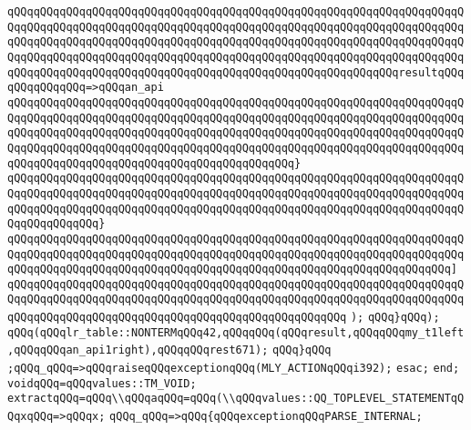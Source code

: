 \verb|qQQqqQQqqQQqqQQqqQQqqQQqqQQqqQQqqQQqqQQqqQQqqQQqqQQqqQQqqQQqqQQqqQQqqQQqqQQqqQQqqQQqqQQqqQQqqQQqqQQqqQQqqQQqqQQqqQQqqQQqqQQqqQQqqQQqqQQqqQQqqQQqqQQqqQQqqQQqqQQqqQQqqQQqqQQqqQQqqQQqqQQqqQQqqQQqqQQqqQQqqQQqqQQqqQQqqQQqqQQqqQQqqQQqqQQqqQQqqQQqqQQqqQQqqQQqqQQqqQQqqQQqqQQqqQQqqQQqqQQqqQQqqQQqqQQqqQQqqQQqqQQqqQQqqQQqqQQqqQQqqQQqqQQqqQQqqQQqqQQqresultqQQqqQQqqQQqqQQq=>qQQqan_api|\newline
\verb|qQQqqQQqqQQqqQQqqQQqqQQqqQQqqQQqqQQqqQQqqQQqqQQqqQQqqQQqqQQqqQQqqQQqqQQqqQQqqQQqqQQqqQQqqQQqqQQqqQQqqQQqqQQqqQQqqQQqqQQqqQQqqQQqqQQqqQQqqQQqqQQqqQQqqQQqqQQqqQQqqQQqqQQqqQQqqQQqqQQqqQQqqQQqqQQqqQQqqQQqqQQqqQQqqQQqqQQqqQQqqQQqqQQqqQQqqQQqqQQqqQQqqQQqqQQqqQQqqQQqqQQqqQQqqQQqqQQqqQQqqQQqqQQqqQQqqQQqqQQqqQQqqQQqqQQqqQQqqQQqqQQq}|\newline
\verb|qQQqqQQqqQQqqQQqqQQqqQQqqQQqqQQqqQQqqQQqqQQqqQQqqQQqqQQqqQQqqQQqqQQqqQQqqQQqqQQqqQQqqQQqqQQqqQQqqQQqqQQqqQQqqQQqqQQqqQQqqQQqqQQqqQQqqQQqqQQqqQQqqQQqqQQqqQQqqQQqqQQqqQQqqQQqqQQqqQQqqQQqqQQqqQQqqQQqqQQqqQQqqQQqqQQqqQQqqQQqqQQq}|\newline
\verb|qQQqqQQqqQQqqQQqqQQqqQQqqQQqqQQqqQQqqQQqqQQqqQQqqQQqqQQqqQQqqQQqqQQqqQQqqQQqqQQqqQQqqQQqqQQqqQQqqQQqqQQqqQQqqQQqqQQqqQQqqQQqqQQqqQQqqQQqqQQqqQQqqQQqqQQqqQQqqQQqqQQqqQQqqQQqqQQqqQQqqQQqqQQqqQQqqQQqqQQqqQQqqQQq]|\newline
\verb|qQQqqQQqqQQqqQQqqQQqqQQqqQQqqQQqqQQqqQQqqQQqqQQqqQQqqQQqqQQqqQQqqQQqqQQqqQQqqQQqqQQqqQQqqQQqqQQqqQQqqQQqqQQqqQQqqQQqqQQqqQQqqQQqqQQqqQQqqQQqqQQqqQQqqQQqqQQqqQQqqQQqqQQqqQQqqQQqqQQqqQQqqQQqqQQq|\newline
\verb|);|\newline
\verb|qQQq}qQQq);|\newline
\verb|qQQq(qQQqlr_table::NONTERMqQQq42,qQQqqQQq(qQQqresult,qQQqqQQqmy_t1left,qQQqqQQqan_api1right),qQQqqQQqrest671);|\newline
\verb|qQQq}qQQq|\newline
\verb|;qQQq_qQQq=>qQQqraiseqQQqexceptionqQQq(MLY_ACTIONqQQqi392);|\newline
\verb|esac;|\newline
\verb|end;|\newline
\verb|voidqQQq=qQQqvalues::TM_VOID;|\newline
\verb|extractqQQq=qQQq\\qQQqaqQQq=qQQq(\\qQQqvalues::QQ_TOPLEVEL_STATEMENTqQQqxqQQq=>qQQqx;|\newline
\verb|qQQq_qQQq=>qQQq{qQQqexceptionqQQqPARSE_INTERNAL;|\newline
